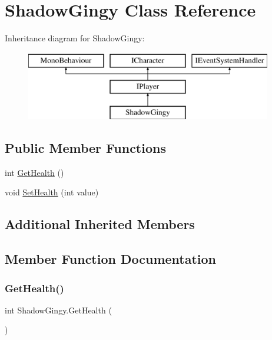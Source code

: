 \hypertarget{class_shadow_gingy}{}\section{Shadow\+Gingy Class Reference}
\label{class_shadow_gingy}
Inheritance diagram for Shadow\+Gingy\+:\begin{figure}[H]
\begin{center}
\leavevmode
\includegraphics[height=3.000000cm]{class_shadow_gingy}
\end{center}
\end{figure}
\subsection*{Public Member Functions}
\begin{DoxyCompactItemize}
\item 
int \mbox{\hyperlink{class_shadow_gingy_afc294713e7f9a65351df2dd45dade854}{Get\+Health}} ()
\item 
void \mbox{\hyperlink{class_shadow_gingy_a748db29527d960eb1de77379f4586234}{Set\+Health}} (int value)
\end{DoxyCompactItemize}
\subsection*{Additional Inherited Members}


\subsection{Member Function Documentation}
\mbox{\label{class_shadow_gingy_afc294713e7f9a65351df2dd45dade854}} 
\subsubsection{\texorpdfstring{Get\+Health()}{GetHealth()}}
{\footnotesize\ttfamily int Shadow\+Gingy.\+Get\+Health (\begin{DoxyParamCaption}{ }\end{DoxyParamCaption})\hspace{0.3cm}{\ttfamily [inline]}}

